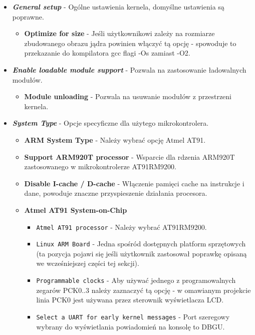 \documentclass[a4paper,12pt]{book}
\begin{document}
					\begin{itemize}
						\item \textit{\textbf{General setup}} - Ogólne ustawienia kernela, domyślne ustawienia są poprawne.
							\begin{itemize}
								\item \textbf{Optimize for size} - Jeśli użytkownikowi zależy na rozmiarze zbudowanego obrazu jądra powinien włączyć tą opcję - spowoduje to przekazanie do kompilatora gcc flagi -Os zamiast -O2.
							\end{itemize}
						\item \textit{\textbf{Enable loadable module support}} - Pozwala na zastosowanie ładowalnych modułów.
							\begin{itemize}
								\item \textbf{Module unloading} - Pozwala na usuwanie modułów z przestrzeni kernela.
							\end{itemize}
						\item \textit{\textbf{System Type}} - Opcje specyficzne dla użytego mikrokontrolera.
							\begin{itemize}
								\item \textbf{ARM System Type} - Należy wybrać opcję Atmel AT91.
								\item \textbf{Support ARM920T processor} - Wsparcie dla rdzenia ARM920T zastosowanego w mikrokontrolerze AT91RM9200.
								\item \textbf{Disable I-cache / D-cache} - Włączenie pamięci cache na instrukcje i dane, powoduje znaczne przyspieszenie działania procesora.
								\item \textbf{Atmel AT91 System-on-Chip}
									\begin{itemize}
										\item \texttt{Atmel AT91 processor} - Należy wybrać AT91RM9200.
										\item \texttt{Linux ARM Board} - Jedna spośród dostępnych platform sprzętowych (ta pozycja pojawi się jeśli użytkownik zastosował poprawkę opisaną we wcześniejszej części tej sekcji).
										\item \texttt{Programmable clocks} - Aby używać jednego z programowalnych zegarów PCK0..3 należy zaznaczyć tą opcję - w omawianym projekcie linia PCK0 jest używana przez sterownik wyświetlacza LCD.
										\item \texttt{Select a UART for early kernel messages} - Port szeregowy wybrany do wyświetlania powiadomień na konsolę to DBGU.
									\end{itemize}

\end{itemize}
\end{itemize}
\end{document}
